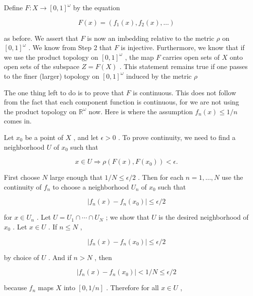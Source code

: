 Define \(F : X \rightarrow  {\left\lbrack  0,1\right\rbrack  }^{\omega }\) by the equation

\[
F\left( x\right)  = \left( {{f}_{1}\left( x\right) ,{f}_{2}\left( x\right) ,\ldots }\right)
\]

as before. We assert that \(F\) is now an imbedding relative to the metric \(\rho\) on \({\left\lbrack  0,1\right\rbrack  }^{\omega }\) . We know from Step 2 that \(F\) is injective. Furthermore, we know that if we use the product topology on \({\left\lbrack  0,1\right\rbrack  }^{\omega }\) , the map \(F\) carries open sets of \(X\) onto open sets of the subspace \(Z = F\left( X\right)\) . This statement remains true if one passes to the finer (larger) topology on \({\left\lbrack  0,1\right\rbrack  }^{\omega }\) induced by the metric \(\rho\)

The one thing left to do is to prove that \(F\) is continuous. This does not follow from the fact that each component function is continuous, for we are not using the product topology on \({\mathbb{R}}^{\omega }\) now. Here is where the assumption \({f}_{n}\left( x\right)  \leq  1/n\) comes in.

Let \({x}_{0}\) be a point of \(X\) , and let \(\epsilon  > 0\) . To prove continuity, we need to find a neighborhood \(U\) of \({x}_{0}\) such that

\[
x \in  U \Rightarrow  \rho \left( {F\left( x\right) ,F\left( {x}_{0}\right) }\right)  < \epsilon .
\]

First choose \(N\) large enough that \(1/N \leq  \epsilon /2\) . Then for each \(n = 1,\ldots ,N\) use the continuity of \({f}_{n}\) to choose a neighborhood \({U}_{n}\) of \({x}_{0}\) such that

\[
\left| {{f}_{n}\left( x\right)  - {f}_{n}\left( {x}_{0}\right) }\right|  \leq  \epsilon /2
\]

for \(x \in  {U}_{n}\) . Let \(U = {U}_{1} \cap  \cdots  \cap  {U}_{N}\) ; we show that \(U\) is the desired neighborhood of \({x}_{0}\) . Let \(x \in  U\) . If \(n \leq  N\) ,

\[
\left| {{f}_{n}\left( x\right)  - {f}_{n}\left( {x}_{0}\right) }\right|  \leq  \epsilon /2
\]

by choice of \(U\) . And if \(n > N\) , then

\[
\left| {{f}_{n}\left( x\right)  - {f}_{n}\left( {x}_{0}\right) }\right|  < 1/N \leq  \epsilon /2
\]

because \({f}_{n}\) maps \(X\) into \(\left\lbrack  {0,1/n}\right\rbrack\) . Therefore for all \(x \in  U\) ,

